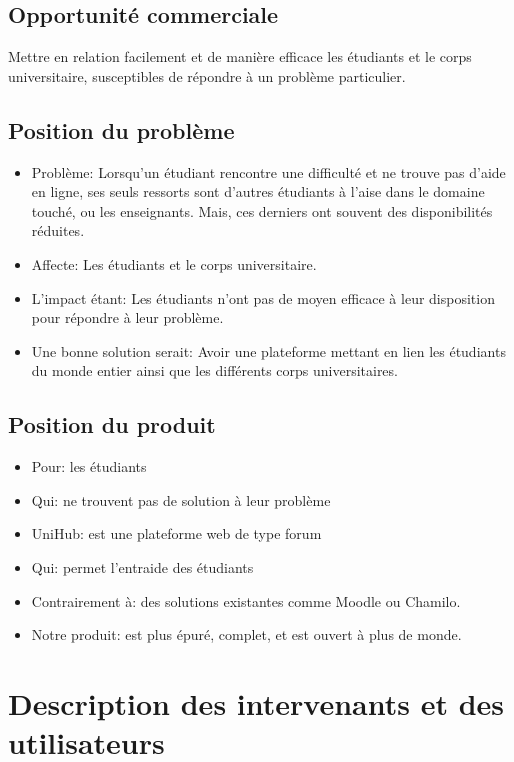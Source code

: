 \subsection{Opportunité commerciale}
Mettre en relation facilement et de manière efficace les étudiants et le corps universitaire, susceptibles de répondre à un problème particulier.


\subsection{Position du problème}
\begin{itemize}
	\item Problème: Lorsqu'un étudiant rencontre une difficulté et ne trouve pas d'aide en ligne, ses seuls ressorts sont d’autres étudiants à l'aise dans le domaine touché, ou les enseignants. Mais, ces derniers ont souvent des disponibilités réduites.
	\item Affecte: Les étudiants et le corps universitaire.
	\item L'impact étant: Les étudiants n’ont pas de moyen efficace à leur disposition pour répondre à leur problème.
	\item Une bonne solution serait: Avoir une plateforme mettant en lien les étudiants du monde entier ainsi que les différents corps universitaires.
\end{itemize}

\subsection{Position du produit}
\begin{itemize}
	\item Pour: les étudiants
	\item Qui: ne trouvent pas de solution à leur problème
	\item UniHub: est une plateforme web de type forum
	\item Qui: permet l’entraide des étudiants
	\item Contrairement à: des solutions existantes comme Moodle ou Chamilo.
	\item Notre produit: est plus épuré, complet, et est ouvert à plus de monde.
\end{itemize}



\section{Description des intervenants et des utilisateurs}
